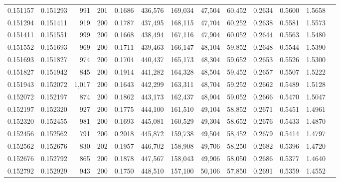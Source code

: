 \begin{tabular}{rrrrrrrrrrrrr}
0.151157 & 0.151293 &    991 & 201 &                                     0.1686 & 436,576 & 169,034 &  47,504 &  60,452 & 0.2634 & 0.5600 & 1.5658 \\
0.151294 & 0.151411 &    919 & 200 &                                     0.1787 & 437,495 & 168,115 &  47,704 &  60,252 & 0.2638 & 0.5581 & 1.5573 \\
0.151411 & 0.151551 &    999 & 200 &                                     0.1668 & 438,494 & 167,116 &  47,904 &  60,052 & 0.2644 & 0.5563 & 1.5480 \\
0.151552 & 0.151693 &    969 & 200 &                                     0.1711 & 439,463 & 166,147 &  48,104 &  59,852 & 0.2648 & 0.5544 & 1.5390 \\
0.151693 & 0.151827 &    974 & 200 &                                     0.1704 & 440,437 & 165,173 &  48,304 &  59,652 & 0.2653 & 0.5526 & 1.5300 \\
0.151827 & 0.151942 &    845 & 200 &                                     0.1914 & 441,282 & 164,328 &  48,504 &  59,452 & 0.2657 & 0.5507 & 1.5222 \\
0.151943 & 0.152072 &  1,017 & 200 &                                     0.1643 & 442,299 & 163,311 &  48,704 &  59,252 & 0.2662 & 0.5489 & 1.5128 \\
0.152072 & 0.152197 &    874 & 200 &                                     0.1862 & 443,173 & 162,437 &  48,904 &  59,052 & 0.2666 & 0.5470 & 1.5047 \\
0.152197 & 0.152320 &    927 & 200 &                                     0.1775 & 444,100 & 161,510 &  49,104 &  58,852 & 0.2671 & 0.5451 & 1.4961 \\
0.152320 & 0.152455 &    981 & 200 &                                     0.1693 & 445,081 & 160,529 &  49,304 &  58,652 & 0.2676 & 0.5433 & 1.4870 \\
0.152456 & 0.152562 &    791 & 200 &                                     0.2018 & 445,872 & 159,738 &  49,504 &  58,452 & 0.2679 & 0.5414 & 1.4797 \\
0.152562 & 0.152676 &    830 & 202 &                                     0.1957 & 446,702 & 158,908 &  49,706 &  58,250 & 0.2682 & 0.5396 & 1.4720 \\
0.152676 & 0.152792 &    865 & 200 &                                     0.1878 & 447,567 & 158,043 &  49,906 &  58,050 & 0.2686 & 0.5377 & 1.4640 \\
0.152792 & 0.152929 &    943 & 200 &                                     0.1750 & 448,510 & 157,100 &  50,106 &  57,850 & 0.2691 & 0.5359 & 1.4552 \\

\end{tabular}
